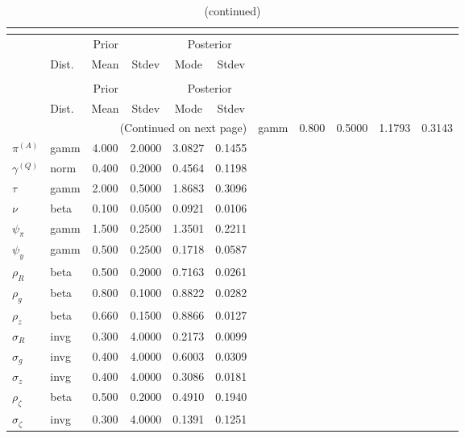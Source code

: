 
\begin{center}
\begin{longtable}{llcccc} 
\caption{Results from posterior maximization (parameters)}\\
 \label{Table:Posterior:1}\\
\toprule 
  & \multicolumn{3}{c}{Prior}  &  \multicolumn{2}{c}{Posterior} \\
  \cmidrule(r{.75em}){2-4} \cmidrule(r{.75em}){5-6}
  & Dist. & Mean  & Stdev & Mode & Stdev \\ 
\midrule \endfirsthead 
\caption{(continued)}\\
 \bottomrule 
  & \multicolumn{3}{c}{Prior}  &  \multicolumn{2}{c}{Posterior} \\
  \cmidrule(r{.75em}){2-4} \cmidrule(r{.75em}){5-6}
  & Dist. & Mean  & Stdev & Mode & Stdev \\ 
\midrule \endhead 
\bottomrule \multicolumn{6}{r}{(Continued on next page)}\endfoot 
\bottomrule\endlastfoot 
${r_{A}}$ & gamm &   0.800 & 0.5000 &   1.1793 &  0.3143 \\ 
${\pi^{(A)}}$ & gamm &   4.000 & 2.0000 &   3.0827 &  0.1455 \\ 
${\gamma^{(Q)}}$ & norm &   0.400 & 0.2000 &   0.4564 &  0.1198 \\ 
${\tau}$ & gamm &   2.000 & 0.5000 &   1.8683 &  0.3096 \\ 
${\nu}$ & beta &   0.100 & 0.0500 &   0.0921 &  0.0106 \\ 
${\psi_\pi}$ & gamm &   1.500 & 0.2500 &   1.3501 &  0.2211 \\ 
${\psi_y}$ & gamm &   0.500 & 0.2500 &   0.1718 &  0.0587 \\ 
${\rho_R}$ & beta &   0.500 & 0.2000 &   0.7163 &  0.0261 \\ 
${\rho_{g}}$ & beta &   0.800 & 0.1000 &   0.8822 &  0.0282 \\ 
${\rho_z}$ & beta &   0.660 & 0.1500 &   0.8866 &  0.0127 \\ 
${\sigma_R}$ & invg &   0.300 & 4.0000 &   0.2173 &  0.0099 \\ 
${\sigma_{g}}$ & invg &   0.400 & 4.0000 &   0.6003 &  0.0309 \\ 
${\sigma_z}$ & invg &   0.400 & 4.0000 &   0.3086 &  0.0181 \\ 
${\rho_\zeta}$ & beta &   0.500 & 0.2000 &   0.4910 &  0.1940 \\ 
${\sigma_\zeta}$ & invg &   0.300 & 4.0000 &   0.1391 &  0.1251 \\ 
\end{longtable}
 \end{center}
